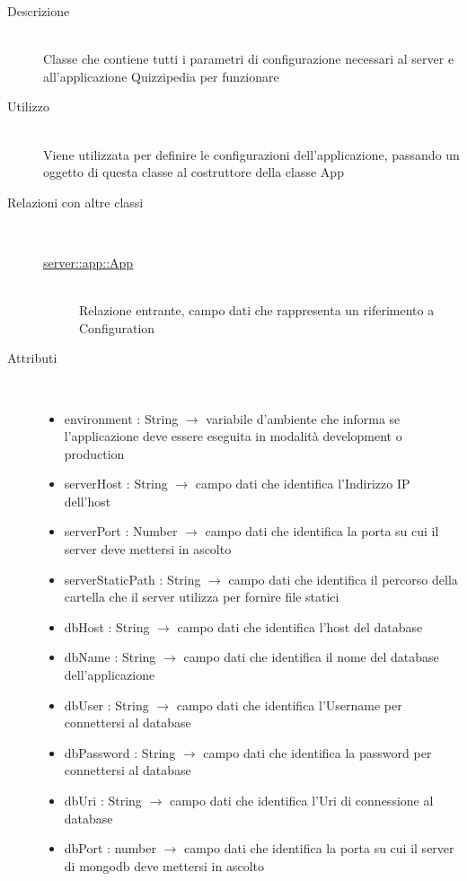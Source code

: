 \begin{description}
\item[Descrizione] \hfill \\
Classe che contiene tutti i parametri di configurazione necessari al server e all'applicazione Quizzipedia per funzionare
\item[Utilizzo] \hfill \\
Viene utilizzata per definire le configurazioni dell'applicazione, passando un oggetto di questa classe al costruttore della classe App
\item[Relazioni con altre classi] \hfill \\
\vspace{-7mm}
\begin{description}
	\item[\hyperlink{server::app::App}{server::app::App}] \hfill \\
	Relazione entrante, campo dati che rappresenta un riferimento a Configuration
\end{description}

\item[Attributi] \hfill \\
\vspace{-7mm}
\begin{itemize}
	\item environment : String $\rightarrow$ variabile d'ambiente che informa se l'applicazione deve essere eseguita in modalità development o production
	\item serverHost : String $\rightarrow$ campo dati che identifica l'Indirizzo IP dell'host
	\item serverPort : Number $\rightarrow$ campo dati che identifica la porta su cui il server deve mettersi in ascolto
	\item serverStaticPath : String $\rightarrow$ campo dati che identifica il percorso della cartella che il server utilizza per fornire file statici
	\item dbHost : String $\rightarrow$ campo dati che identifica l'host del database
	\item dbName : String $\rightarrow$ campo dati che identifica il nome del database dell'applicazione
	\item dbUser : String $\rightarrow$ campo dati che identifica l'Username per connettersi al database
	\item dbPassword : String $\rightarrow$ campo dati che identifica la password per connettersi al database
	\item dbUri : String $\rightarrow$ campo dati che identifica l'Uri di connessione al database
	\item dbPort : number $\rightarrow$ campo dati che identifica la porta su cui il server di mongodb deve mettersi in ascolto
\end{itemize}


\end{description}
